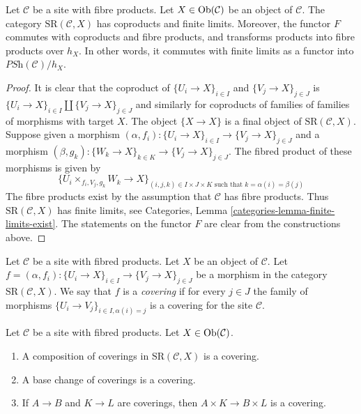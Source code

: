 \begin{lemma}
\label{lemma-coprod-prod-SR}
Let $\mathcal{C}$ be a site with fibre products.
Let $X \in \mathop{\rm Ob}\nolimits(\mathcal{C})$ be an object of $\mathcal{C}$.
The category $\text{SR}(\mathcal{C}, X)$ has
coproducts and finite limits. Moreover, the functor $F$ commutes
with coproducts and fibre products, and transforms products
into fibre products over $h_X$. In other words, it commutes
with finite limits as a functor into $\textit{PSh}(\mathcal{C})/h_X$.
\end{lemma}

\begin{proof}
It is clear that the coproduct of
$\{U_i \to X\}_{i \in I}$ and $\{V_j \to X\}_{j \in J}$
is $\{U_i \to X\}_{i \in I} \amalg \{V_j \to X\}_{j \in J}$
and similarly for coproducts of
families of families of morphisms with target $X$.
The object $\{X \to X\}$ is a final
object of $\text{SR}(\mathcal{C}, X)$.
Suppose given a morphism
$(\alpha, f_i) : \{U_i \to X\}_{i \in I} \to \{V_j \to X\}_{j \in J}$
and a morphism
$(\beta, g_k) : \{W_k \to X\}_{k \in K} \to \{V_j \to X\}_{j \in J}$.
The fibred product of these morphisms is given by
$$
\{ U_i \times_{f_i, V_j, g_k} W_k \to X \}_{(i, j, k) \in I \times J \times K
\text{ such that } k = \alpha(i) = \beta(j)}
$$
The fibre products exist by the assumption that
$\mathcal{C}$ has fibre products.
Thus $\text{SR}(\mathcal{C}, X)$ has finite limits,
see Categories, Lemma \ref{categories-lemma-finite-limits-exist}.
The statements on the functor $F$ are clear from the constructions
above.
\end{proof}

\begin{definition}
\label{definition-covering-SR}
Let $\mathcal{C}$ be a site with fibred products.
Let $X$ be an object of $\mathcal{C}$.
Let $f = (\alpha, f_i) : \{U_i \to X\}_{i \in I} \to \{V_j \to X\}_{j \in J}$
be a morphism in the category $\text{SR}(\mathcal{C}, X)$.
We say that $f$ is a {\it covering} if for every $j \in J$ the
family of morphisms $\{U_i \to V_j\}_{i \in I, \alpha(i) = j}$
is a covering for the site $\mathcal{C}$.
\end{definition}

\begin{lemma}
\label{lemma-covering-permanence}
Let $\mathcal{C}$ be a site with fibred products.
Let $X \in \mathop{\rm Ob}\nolimits(\mathcal{C})$.
\begin{enumerate}
\item A composition of coverings in $\text{SR}(\mathcal{C}, X)$
is a covering.
\item A base change of coverings is a covering.
\item If $A \to B$ and $K \to L$ are coverings,
then $A \times K \to B \times L$ is a covering.
\end{enumerate}
\end{lemma}

